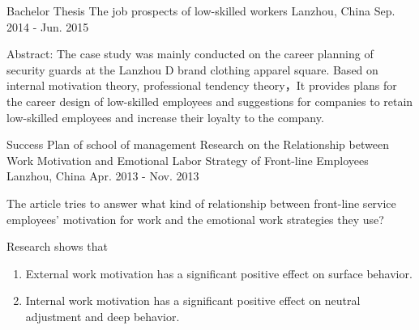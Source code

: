 \begin{cventries}
    {Bachelor Thesis}
    {The job prospects of low-skilled workers}
    {Lanzhou, China}
    {Sep. 2014 - Jun. 2015}
    {
      \begin{cvitems}
      \item {Abstract: The case study was mainly conducted on the career planning of security guards at the Lanzhou D brand clothing apparel square. Based on internal motivation theory, professional tendency theory，It provides plans for the career design of low-skilled employees and suggestions for companies to retain low-skilled employees and increase their loyalty to the company.}
      \end{cvitems}
    }
  \cventry
    {Success Plan of school of management}
    {Research on the Relationship between Work Motivation and Emotional Labor Strategy of Front-line Employees}
    {Lanzhou, China}
    {Apr. 2013 - Nov. 2013}
    {
      \begin{cvitems}
        \item {The article tries to answer what kind of relationship between front-line service employees' motivation for work and the emotional work strategies they use?}
	\item {Research shows that}
	\begin{enumerate}
	    \item {External work motivation has a significant positive effect on surface behavior.}
	    \item {Internal work motivation has a significant positive effect on neutral adjustment and deep behavior.}
	\end{enumerate}
      \end{cvitems} 
    }
\end{cventries}

